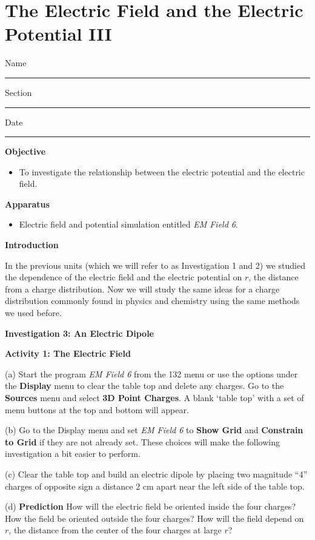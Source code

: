 
\section{The Electric Field and the Electric Potential III}

Name \rule{2.0in}{0.1pt}\hfill{}Section \rule{1.0in}{0.1pt}\hfill{}Date
\rule{1.0in}{0.1pt}

\textbf{Objective}

\begin{itemize}
\item To investigate the relationship between the electric potential and
the electric field.
\end{itemize}

\textbf{Apparatus}

\begin{itemize}
\item Electric field and potential simulation entitled {\it EM Field 6}.
\end{itemize}

\textbf{Introduction}

In the previous units (which we will refer to as Investigation 1 and 2) we studied the dependence
of the electric field and the electric potential on $r$, the distance from
a charge distribution.
Now we will study the same ideas for a charge distribution commonly found in physics and chemistry
using the same methods we used before.

\textbf{Investigation 3: An Electric Dipole}

\textbf{Activity 1: The Electric Field}

(a) Start the program {\it EM Field 6} from the 132 menu or use the options under the 
\textbf{Display} menu to clear the table top and delete any charges.
Go to the \textbf{Sources} menu and select \textbf{3D Point Charges}.
A blank `table top' with a set of menu 
buttons at the top and bottom will appear.

(b) Go to the Display menu and set {\it EM Field 6} to
{\bf Show Grid} and {\bf Constrain to Grid} if they are not already set.
These choices will make the following investigation a bit easier to perform.

(c) Clear the table top and build an electric dipole by placing two magnitude
{}``4'' charges of opposite sign a distance 2 cm apart near the
left side of the table top.


(d) {\bf Prediction} How will the electric field be oriented inside the four charges?
How the field be oriented outside the four charges?
How will the field depend on $r$, the distance from the center of the four charges
at large $r$?
\vspace{25mm}

